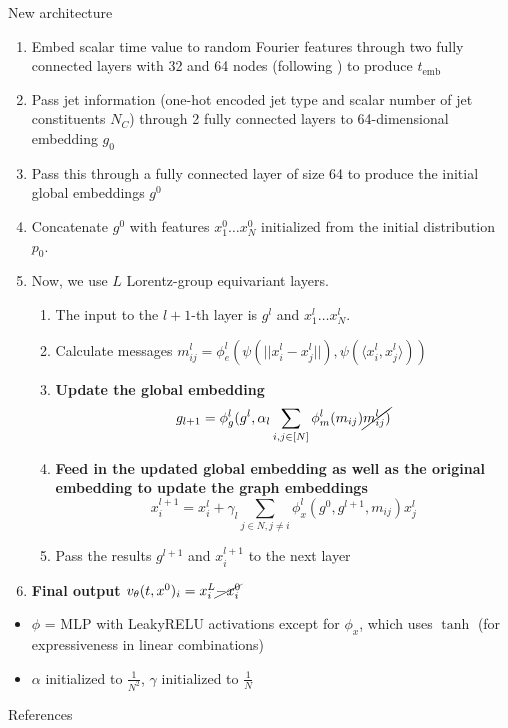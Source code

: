 \documentclass[handout, aspectratio=169,xcolor=dvipsnames]{beamer}
\begin{document}
\begin{frame}[allowframebreaks]{New architecture}
    \begin{enumerate}
        \item Embed scalar time value to random Fourier features through two fully connected layers with 32 and 64 nodes (following \cite{wuFastPointCloud2023}) to produce $t_\text{emb}$
        \item Pass jet information (one-hot encoded jet type and scalar number of jet constituents $N_C$) through 2 fully connected layers to 64-dimensional embedding $g_0$
        \item Pass this through a fully connected layer of size 64 to produce the initial global embeddings $g^0$
        \item Concatenate $g^0$ with features $x_1^0 \dots x_N^0$ initialized from the initial distribution $p_0$.
        \item Now, we use $L$ Lorentz-group equivariant layers. \begin{enumerate}
            \item The input to the $l+1$-th layer is $g^l$ and $x^{l}_1 \dots x^l_N$.
            \item Calculate messages $m^l_{ij} = \phi_e^l(\psi(||x_i^l - x_j^l||), \psi(\langle x_i^l, x_j^l \rangle))$
            \item \textbf{Update the global embedding $$g_{l+1} = \phi^l_{g}(g^l, \alpha_l \sum\limits_{i, j \in [N]}  \phi_m^l(m_{ij}) \cancel{m^l_{ij})}$$}
            \item \textbf{Feed in the updated global embedding as well as the original embedding to update the graph embeddings} $$
            x_i^{l+1} = x_i^{l} + \gamma_l \sum\limits_{j \in N, j \neq i} \phi^l_{x} (g^0, g^{l+1}, m_{ij}) x_j^l
            $$
            \item Pass the results $g^{l+1}$ and $x_i^{l+1}$ to the next layer
        \end{enumerate}
        \item \textbf{Final output $v_\theta(t, x^0)_i = x_i^L \cancel{- x_i^{0}}$}
    \end{enumerate}

    \begin{itemize}
        \item $\phi$ = MLP with LeakyRELU activations except for $\phi_x$, which uses $\tanh$ (for expressiveness in linear combinations)
        \item $\alpha$ initialized to $\frac{1}{N^2}$, $\gamma$ initialized to $\frac{1}{N}$ 
    \end{itemize}
\end{frame}



\begin{frame}[allowframebreaks]{References}
\printbibliography
\end{frame}
\end{document}
